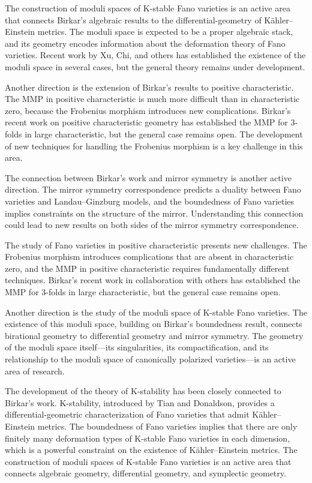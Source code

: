The construction of moduli spaces of K-stable Fano varieties is an active area that connects Birkar's algebraic results to the differential-geometry of K\"ahler--Einstein metrics. The moduli space is expected to be a proper algebraic stack, and its geometry encodes information about the deformation theory of Fano varieties. Recent work by Xu, Chi, and others has established the existence of the moduli space in several cases, but the general theory remains under development.

Another direction is the extension of Birkar's results to positive characteristic. The MMP in positive characteristic is much more difficult than in characteristic zero, because the Frobenius morphism introduces new complications. Birkar's recent work on positive characteristic geometry has established the MMP for 3-folds in large characteristic, but the general case remains open. The development of new techniques for handling the Frobenius morphism is a key challenge in this area.

The connection between Birkar's work and mirror symmetry is another active direction. The mirror symmetry correspondence predicts a duality between Fano varieties and Landau--Ginzburg models, and the boundedness of Fano varieties implies constraints on the structure of the mirror. Understanding this connection could lead to new results on both sides of the mirror symmetry correspondence.

The study of Fano varieties in positive characteristic presents new challenges. The Frobenius morphism introduces complications that are absent in characteristic zero, and the MMP in positive characteristic requires fundamentally different techniques. Birkar's recent work in collaboration with others has established the MMP for 3-folds in large characteristic, but the general case remains open.

Another direction is the study of the moduli space of K-stable Fano varieties. The existence of this moduli space, building on Birkar's boundedness result, connects birational geometry to differential geometry and mirror symmetry. The geometry of the moduli space itself---its singularities, its compactification, and its relationship to the moduli space of canonically polarized varieties---is an active area of research.

The development of the theory of K-stability has been closely connected to Birkar's work. K-stability, introduced by Tian and Donaldson, provides a differential-geometric characterization of Fano varieties that admit K\"ahler--Einstein metrics. The boundedness of Fano varieties implies that there are only finitely many deformation types of K-stable Fano varieties in each dimension, which is a powerful constraint on the existence of K\"ahler--Einstein metrics. The construction of moduli spaces of K-stable Fano varieties is an active area that connects algebraic geometry, differential geometry, and symplectic geometry.

